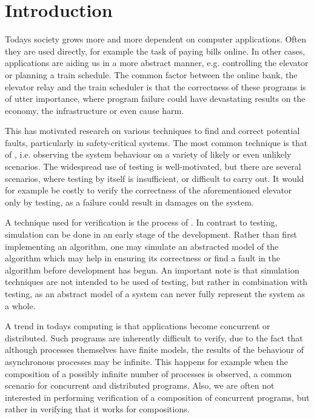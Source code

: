 \newpage
\section{Introduction}
Todays society grows more and more dependent on computer applications. Often they are used directly, for example the task of paying bills online. In other cases, applications are aiding us in a more abstract manner, e.g. controlling the elevator or planning a train schedule. The common factor between the online bank, the elevator relay and the train scheduler is that the correctness of these programs is of utter importance, where program failure could have devastating results on the economy, the infrastructure or even cause harm.

This has motivated research on various techniques to find and correct potential faults, particularly in safety-critical systems. The most common technique is that of , i.e. observing the system behaviour on a variety of likely or even unlikely scenarios. The widespread use of testing is well-motivated, but there are several scenarios, where testing by itself is insufficient, or difficult to carry out. It would for example be costly to verify the correctness of the aforementioned elevator only by testing, as a failure could result in damages on the system.

A technique used for verification is the process of . In contrast to testing, simulation can be done in an early stage of the development. Rather than first implementing an algorithm, one may simulate an abstracted model of the algorithm which may help in ensuring its correctness or find a fault in the algorithm before development has begun. An important note is that simulation techniques are not intended to be used  of testing, but rather in combination with testing, as an abstract model of a system can never fully represent the system as a whole.

A trend in todays computing is that applications become concurrent or distributed. Such programs are inherently difficult to verify, due to the fact that although processes themselves have finite models, the results of the behaviour of asynchronous processes may be infinite. This happens for example when the composition of a possibly infinite number of processes is observed, a common scenario for  concurrent and distributed programs. Also, we are often not interested in performing verification of a  composition of concurrent programs, but rather in verifying that it works for  compositions.

